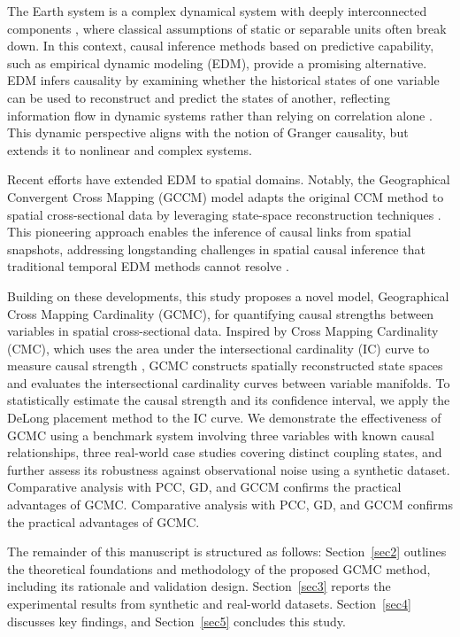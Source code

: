 \documentclass[authoryear,preprint,review,12pt]{elsarticle}
\begin{document}
The Earth system is a complex dynamical system with deeply interconnected components \citep{runge2019esstsc,runge2023tsc}, where classical assumptions of static or separable units often break down. In this context, causal inference methods based on predictive capability, such as empirical dynamic modeling (EDM), provide a promising alternative. EDM infers causality by examining whether the historical states of one variable can be used to reconstruct and predict the states of another, reflecting information flow in dynamic systems rather than relying on correlation alone \citep{sugihara2012ccm,leng2020pcm,tao2023cmc}. This dynamic perspective aligns with the notion of Granger causality, but extends it to nonlinear and complex systems.

Recent efforts have extended EDM to spatial domains. Notably, the Geographical Convergent Cross Mapping (GCCM) model adapts the original CCM method \citep{sugihara2012ccm} to spatial cross-sectional data by leveraging state-space reconstruction techniques \citep{lorenz1969ssr,Takens1981embedding,Mane1981embedding}. This pioneering approach enables the inference of causal links from spatial snapshots, addressing longstanding challenges in spatial causal inference that traditional temporal EDM methods cannot resolve \citep{gao2022tscess,gao2023gccm}.

Building on these developments, this study proposes a novel model, Geographical Cross Mapping Cardinality (GCMC), for quantifying causal strengths between variables in spatial cross-sectional data. Inspired by Cross Mapping Cardinality (CMC), which uses the area under the intersectional cardinality (IC) curve to measure causal strength \citep{tao2023cmc}, GCMC constructs spatially reconstructed state spaces and evaluates the intersectional cardinality curves between variable manifolds. To statistically estimate the causal strength and its confidence interval, we apply the DeLong placement method \citep{delong1988,sun2014delongfi} to the IC curve. We demonstrate the effectiveness of GCMC using a benchmark system involving three variables with known causal relationships, three real-world case studies covering distinct coupling states, and further assess its robustness against observational noise using a synthetic dataset. Comparative analysis with PCC, GD, and GCCM confirms the practical advantages of GCMC. Comparative analysis with PCC, GD, and GCCM confirms the practical advantages of GCMC.

The remainder of this manuscript is structured as follows: Section~\ref{sec2} outlines the theoretical foundations and methodology of the proposed GCMC method, including its rationale and validation design. Section~\ref{sec3} reports the experimental results from synthetic and real-world datasets. Section~\ref{sec4} discusses key findings, and Section~\ref{sec5} concludes this study.
\end{document}
